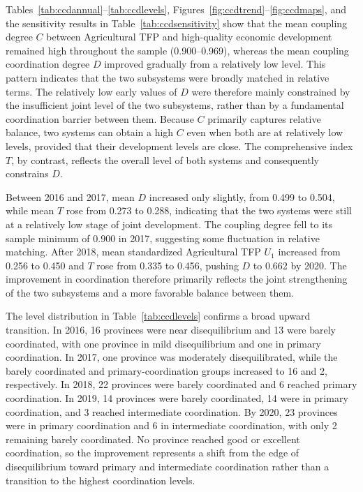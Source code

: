 \documentclass[sustainability,article,submit,moreauthors]{Definitions/mdpi}
\numberwithin{equation}{section}
\begin{document}
Tables~\ref{tab:ccdannual}--\ref{tab:ccdlevels}, Figures~\ref{fig:ccdtrend}--\ref{fig:ccdmaps},
and the sensitivity results in Table~\ref{tab:ccdsensitivity} show that the mean
coupling degree $C$ between Agricultural TFP and high-quality economic
development remained high throughout the sample (0.900--0.969), whereas the
mean coupling coordination degree $D$ improved gradually from a relatively low
level. This pattern indicates that the two subsystems were broadly matched in
relative terms. The relatively low early values of $D$ were therefore mainly
constrained by the insufficient joint level of the two subsystems, rather than
by a fundamental coordination barrier between them. Because $C$ primarily
captures relative balance, two systems can obtain a high $C$ even when both are
at relatively low levels, provided that their development levels are close. The
comprehensive index $T$, by contrast, reflects the overall level of both systems
and consequently constrains $D$.

Between 2016 and 2017, mean $D$ increased only slightly, from 0.499 to 0.504,
while mean $T$ rose from 0.273 to 0.288, indicating that the two systems were
still at a relatively low stage of joint development. The coupling degree fell
to its sample minimum of 0.900 in 2017, suggesting some fluctuation in relative
matching. After 2018, mean standardized Agricultural TFP $U_1$ increased from
0.256 to 0.450 and $T$ rose from 0.335 to 0.456, pushing $D$ to 0.662 by 2020.
The improvement in coordination therefore primarily reflects the joint
strengthening of the two subsystems and a more favorable balance between them.

The level distribution in Table~\ref{tab:ccdlevels} confirms a broad upward
transition. In 2016, 16 provinces were near disequilibrium and 13 were barely
coordinated, with one province in mild disequilibrium and one in primary
coordination. In 2017, one province was moderately disequilibrated, while the
barely coordinated and primary-coordination groups increased to 16 and 2,
respectively. In 2018, 22 provinces were barely coordinated and 6 reached
primary coordination. In 2019, 14 provinces were barely coordinated, 14 were in
primary coordination, and 3 reached intermediate coordination. By 2020, 23
provinces were in primary coordination and 6 in intermediate coordination, with
only 2 remaining barely coordinated. No province reached good or excellent
coordination, so the improvement represents a shift from the edge of
disequilibrium toward primary and intermediate coordination rather than a
transition to the highest coordination levels.
\end{document}
